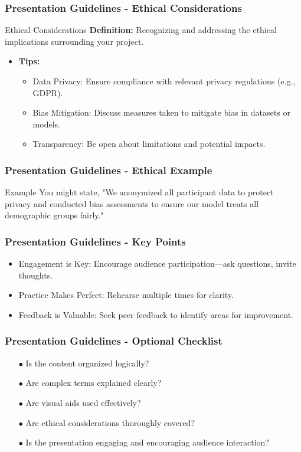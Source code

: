 \documentclass[aspectratio=169]{beamer}
\begin{document}
\begin{frame}[fragile]
    \frametitle{Presentation Guidelines - Ethical Considerations}
    \begin{block}{Ethical Considerations}
        \textbf{Definition:} Recognizing and addressing the ethical implications surrounding your project.
    \end{block}
    \begin{itemize}
        \item \textbf{Tips:}
        \begin{itemize}
            \item Data Privacy: Ensure compliance with relevant privacy regulations (e.g., GDPR).
            \item Bias Mitigation: Discuss measures taken to mitigate bias in datasets or models.
            \item Transparency: Be open about limitations and potential impacts.
        \end{itemize}
    \end{itemize}
\end{frame}

\begin{frame}[fragile]
    \frametitle{Presentation Guidelines - Ethical Example}
    \begin{block}{Example}
        You might state, "We anonymized all participant data to protect privacy and conducted bias assessments to ensure our model treats all demographic groups fairly."
    \end{block}
\end{frame}

\begin{frame}[fragile]
    \frametitle{Presentation Guidelines - Key Points}
    \begin{itemize}
        \item Engagement is Key: Encourage audience participation—ask questions, invite thoughts.
        \item Practice Makes Perfect: Rehearse multiple times for clarity.
        \item Feedback is Valuable: Seek peer feedback to identify areas for improvement.
    \end{itemize}
\end{frame}

\begin{frame}[fragile]
    \frametitle{Presentation Guidelines - Optional Checklist}
    \begin{itemize}
        \item[$\bullet$] Is the content organized logically?
        \item[$\bullet$] Are complex terms explained clearly?
        \item[$\bullet$] Are visual aids used effectively?
        \item[$\bullet$] Are ethical considerations thoroughly covered?
        \item[$\bullet$] Is the presentation engaging and encouraging audience interaction?
    \end{itemize}
\end{frame}
\end{document}
